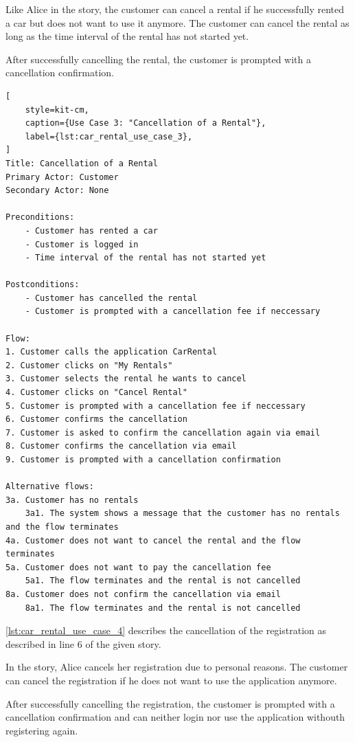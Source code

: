 Like Alice in the story, the customer can cancel a rental if he successfully rented a car but does not want to use it anymore.
The customer can cancel the rental as long as the time interval of the rental has not started yet.

After successfully cancelling the rental, the customer is prompted with a cancellation confirmation.

\begin{lstlisting}[
    style=kit-cm,
    caption={Use Case 3: "Cancellation of a Rental"},
    label={lst:car_rental_use_case_3},
]
Title: Cancellation of a Rental
Primary Actor: Customer
Secondary Actor: None

Preconditions:
    - Customer has rented a car
    - Customer is logged in
    - Time interval of the rental has not started yet

Postconditions:
    - Customer has cancelled the rental
    - Customer is prompted with a cancellation fee if neccessary

Flow:
1. Customer calls the application CarRental
2. Customer clicks on "My Rentals"
3. Customer selects the rental he wants to cancel
4. Customer clicks on "Cancel Rental"
5. Customer is prompted with a cancellation fee if neccessary
6. Customer confirms the cancellation
7. Customer is asked to confirm the cancellation again via email
8. Customer confirms the cancellation via email
9. Customer is prompted with a cancellation confirmation

Alternative flows:
3a. Customer has no rentals
    3a1. The system shows a message that the customer has no rentals and the flow terminates
4a. Customer does not want to cancel the rental and the flow terminates
5a. Customer does not want to pay the cancellation fee
    5a1. The flow terminates and the rental is not cancelled
8a. Customer does not confirm the cancellation via email
    8a1. The flow terminates and the rental is not cancelled
\end{lstlisting}

\autoref{lst:car_rental_use_case_4} describes the cancellation of the registration as described in line 6 of the given story.

In the story, Alice cancels her registration due to personal reasons.
The customer can cancel the registration if he does not want to use the application anymore.

After successfully cancelling the registration, the customer is prompted with a cancellation confirmation and can neither login nor use the application withouth registering again.

